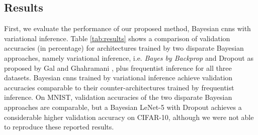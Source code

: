\subsection{Results}
First, we evaluate the performance of our proposed method, Bayesian \acp{cnn} with variational inference. Table \ref{tab:results} shows a comparison of validation accuracies (in percentage) for architectures trained by two disparate Bayesian approaches, namely variational inference, i.e. \textit{Bayes by Backprop} and Dropout as proposed by Gal and Ghahramani \cite{gal2015bayesian}, plus frequentist inference for all three datasets. Bayesian \acp{cnn} trained by variational inference achieve validation accuracies comparable to their counter-architectures trained by frequentist inference. On MNIST, validation accuracies of the two disparate Bayesian approaches are comparable, but a Bayesian LeNet-5 with Dropout achieves a considerable higher validation accuracy on CIFAR-10, although we were not able to reproduce these reported results.
\begin{table}[b!]
\tiny
    \centering
    \renewcommand{\arraystretch}{1.5}
    \renewcommand{\arraystretch}{1.5}
    \caption{Comparison of validation accuracies (in percentage) for different architectures with variational inference (VI), frequentist inference and Dropout as a Bayesian approximation as proposed by Gal and Ghahramani \cite{gal2015bayesian} for MNIST, CIFAR-10, and CIFAR-100.}
    \label{tab:results}
\end{table}
